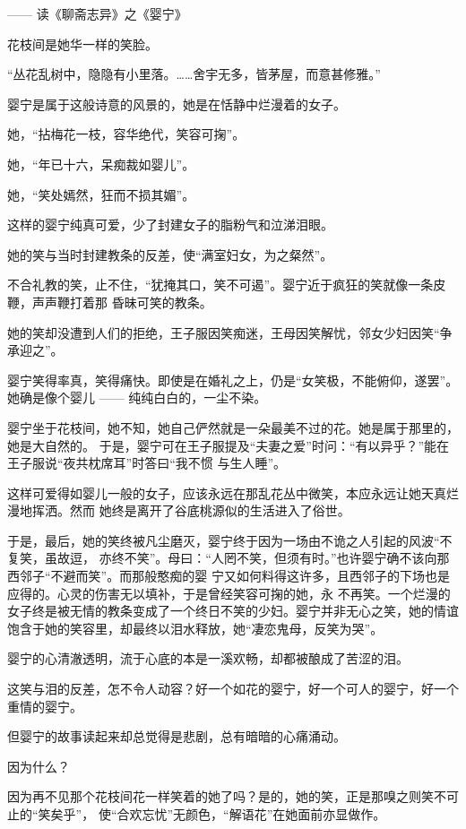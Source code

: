 \documentclass[12pt,a4paper]{article}
\begin{document}
		—— 读《聊斋志异》之《婴宁》

		花枝间是她华一样的笑脸。\par
		“丛花乱树中，隐隐有小里落。……舍宇无多，皆茅屋，而意甚修雅。”\par
		婴宁是属于这般诗意的风景的，她是在恬静中烂漫着的女子。\par
		她，“拈梅花一枝，容华绝代，笑容可掬”。\par
		她，“年已十六，呆痴裁如婴儿”。\par
		她，“笑处嫣然，狂而不损其媚”。\par
		这样的婴宁纯真可爱，少了封建女子的脂粉气和泣涕泪眼。\par
		她的笑与当时封建教条的反差，使“满室妇女，为之粲然”。

		不合礼教的笑，止不住，“犹掩其口，笑不可遏”。婴宁近于疯狂的笑就像一条皮鞭，声声鞭打着那
	昏昧可笑的教条。

		她的笑却没遭到人们的拒绝，王子服因笑痴迷，王母因笑解忧，邻女少妇因笑“争承迎之”。

		婴宁笑得率真，笑得痛快。即使是在婚礼之上，仍是“女笑极，不能俯仰，遂罢”。她确是像个婴儿
	—— 纯纯白白的，一尘不染。

		婴宁坐于花枝间，她不知，她自己俨然就是一朵最美不过的花。她是属于那里的，她是大自然的。
	于是，婴宁可在王子服提及“夫妻之爱”时问：“有以异乎？”能在王子服说“夜共枕席耳”时答曰“我不惯
	与生人睡”。

		这样可爱得如婴儿一般的女子，应该永远在那乱花丛中微笑，本应永远让她天真烂漫地挥洒。然而
	她终是离开了谷底桃源似的生活进入了俗世。

		于是，最后，她的笑终被凡尘磨灭，婴宁终于因为一场由不诡之人引起的风波“不复笑，虽故逗，
	亦终不笑”。母曰：“人罔不笑，但须有时。”也许婴宁确不该向那西邻子“不避而笑”。而那般憨痴的婴
	宁又如何料得这许多，且西邻子的下场也是应得的。心灵的伤害无以填补，于是曾经笑容可掬的她，永
	不再笑。一个烂漫的女子终是被无情的教条变成了一个终日不笑的少妇。婴宁并非无心之笑，她的情谊
	饱含于她的笑容里，却最终以泪水释放，她“凄恋鬼母，反笑为哭”。

		婴宁的心清澈透明，流于心底的本是一溪欢畅，却都被酿成了苦涩的泪。

		这笑与泪的反差，怎不令人动容？好一个如花的婴宁，好一个可人的婴宁，好一个重情的婴宁。

		但婴宁的故事读起来却总觉得是悲剧，总有暗暗的心痛涌动。

		因为什么？

		因为再不见那个花枝间花一样笑着的她了吗？是的，她的笑，正是那嗅之则笑不可止的“笑矣乎”，
	使“合欢忘忧”无颜色，“解语花”在她面前亦显做作。
\end{document}
